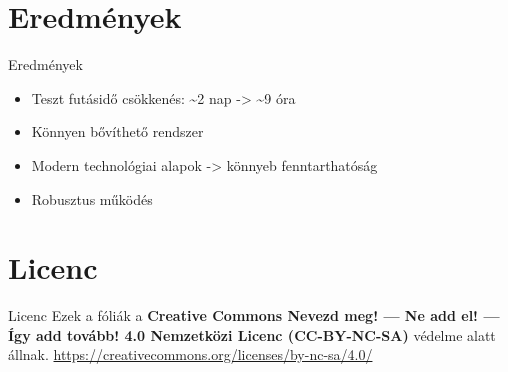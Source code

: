 \documentclass[aspectratio=169,9pt]{beamer}
\begin{document}
\section{Eredmények}

    \begin{frame}{Eredmények}
        \begin{itemize}
            \item Teszt futásidő csökkenés: \~{}2 nap -> \~{}9 óra
            \item Könnyen bővíthető rendszer
            \item Modern technológiai alapok -> könnyeb fenntarthatóság
            \item Robusztus működés
        \end{itemize}
    \end{frame}

\section{Licenc}
    \begingroup
    \begin{frame}{Licenc}
        \centering
        Ezek a fóliák a
        \textbf{Creative Commons Nevezd meg! --- Ne add el! --- Így add tovább! 4.0 Nemzetközi Licenc (CC-BY-NC-SA)}
        védelme alatt állnak.\protect{\\}
        \url{https://creativecommons.org/licenses/by-nc-sa/4.0/}\protect{\\}
        \vspace{\fill}
        {\huge\ccbyncsa{}}
    \end{frame}
    \endgroup
\end{document}
